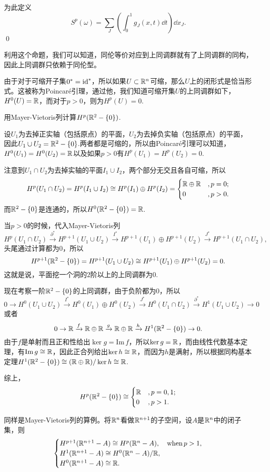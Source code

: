 为此定义
\[
S^p(\omega)=\sum_J\left(\int_0^1g_J(x,t)\dd t\right)\dd x_J.
\]\qed

利用这个命题，我们可以知道，同伦等价对应到上同调群就有了上同调群的同构，因此上同调群只依赖于同伦型。

\para 由于对于可缩开子集$0^*=\operatorname{id}^*$，所以如果$U\subset \mathbb{R}^n$可缩，那么$U$上的闭形式是恰当形式。这被称为Poincaré引理，通过他，我们知道可缩开集$U$的上同调群如下，$H^0(U)=\mathbb{R}$，而对于$p>0$，则为$H^p(U)=0$.

\para 用Mayer-Vietoris列计算$H^{p}(\mathbb{R}^2-\{0\})$.

设$U_1$为去掉正实轴（包括原点）的平面，$U_2$为去掉负实轴（包括原点）的平面，因此$U_1\cup U_2=\mathbb{R}^2-\{0\}$.两者都是可缩的，所以由Poincaré引理可以知道，$H^0(U_1)=H^0(U_2)=\mathbb{R}$以及如果$p>0$有$H^p(U_1)=H^p(U_2)=0$.

注意到$U_1\cap U_2$为去掉实轴的平面$I_1\cup I_2$，两个部分无交且各自可缩，所以
\[
H^p(U_1\cap U_2)=H^p(I_1\cup I_2) \cong H^p(I_1)\oplus H^p(I_2) =\begin{cases}
\mathbb{R}\oplus\mathbb{R}&,p=0;\\
0&,p>0.
\end{cases}
\]
而$\mathbb{R}^2-\{0\}$是连通的，所以$H^0(\mathbb{R}^2-\{0\})=\mathbb{R}$.

当$p>0$的时候，代入Mayer-Vietoris列
\[
H^p(U_1\cap U_2)\xrightarrow{\partial^*}H^{p+1}(U_1\cup U_2)\xrightarrow{I^*}H^{p+1}(U_1)\oplus H^{p+1}(U_2)\xrightarrow{J^*}H^{p+1}(U_1\cap U_2),
\]
头尾通过计算都为$0$，所以
\[
H^{p+1}(\mathbb{R}^2-\{0\})=H^{p+1}(U_1\cup U_2)\cong H^{p+1}(U_1)\oplus H^{p+1}(U_2)=0.
\]
这就是说，平面挖一个洞的$2$阶以上的上同调群为$0$.

现在考察一阶$\mathbb{R}^2-\{0\}$的上同调群，由于负阶都为$0$，所以
 \[
0\to H^0(U_1\cup U_2)\xrightarrow{I^*}H^0(U_1)\oplus H^0(U_2)\xrightarrow{J^*}H^0(U_1\cap U_2)\xrightarrow{\partial^*}H^{1}(U_1\cup U_2)\to 0
\]
或者
 \[
0\to \mathbb{R}\xrightarrow{f}\mathbb{R}\oplus\mathbb{R}\xrightarrow{g}\mathbb{R}\oplus\mathbb{R}\xrightarrow{h}H^{1}(\mathbb{R}^2-\{0\})\to 0.
\]
由于$f$是单射而且正和性给出$\ker g = \mathrm{Im}\,f$，所以$\ker g =\mathbb{R}$，而由线性代数基本定理，有$\mathrm{Im}\,g \cong \mathbb{R}$，因此正合列给出$\ker h \cong \mathbb{R}$，而因为$h$是满射，所以根据同构基本定理$H^{1}(\mathbb{R}^2-\{0\})\cong(\mathbb{R}\oplus\mathbb{R})/\ker h \cong \mathbb{R}$.

综上，\[H^{p}(\mathbb{R}^2-\{0\})\cong
\begin{cases}
\mathbb{R}&,p=0,1;\\
0&,p>1.
\end{cases}\]

\para  同样是Mayer-Vietoris列的算例。将$\mathbb{R}^n$看做$\mathbb{R}^{n+1}$的子空间，设$A$是$\mathbb{R}^n$中的闭子集，则
\[
\begin{cases}
H^{p+1}(\mathbb{R}^{n+1}-A)\cong H^p(\mathbb{R}^n-A),&\text{when}\,p>1,\\
H^{1}(\mathbb{R}^{n+1}-A)\cong H^0(\mathbb{R}^n-A)/\mathbb{R},&\\
H^{0}(\mathbb{R}^{n+1}-A)\cong \mathbb{R}.&
\end{cases}
\]


